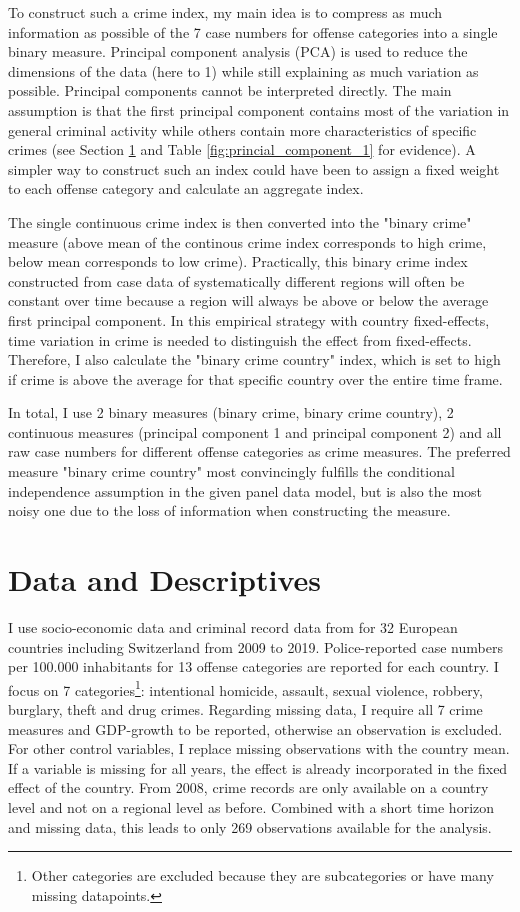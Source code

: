 \documentclass[a4paper,12pt]{article}
\begin{document}
To construct such a crime index, my main idea is to compress as much information as possible of the 7 case numbers for offense categories into a single binary measure. 
Principal component analysis (PCA) is used to reduce the dimensions of the data (here to 1) while still explaining as much variation as possible. Principal components cannot be interpreted directly. The main assumption is that the first principal component contains most of the variation in general criminal activity while others contain more characteristics of specific crimes (see Section \ref{Data} and Table \ref{fig:princial_component_1} for evidence).
A simpler way to construct such an index could have been to assign a fixed weight to each offense category and calculate an aggregate index. 

The single continuous crime index is then converted into the "binary crime" measure (above mean of the continous crime index corresponds to high crime, below mean corresponds to low crime). Practically, this binary crime index constructed from case data of systematically different regions will often be constant over time because a region will always be above or below the average first principal component. In this empirical strategy with country fixed-effects, time variation in crime is needed to distinguish the effect from fixed-effects. Therefore, I also calculate the "binary crime country" index, which is set to high if crime is above the average for that specific country over the entire time frame. 

In total, I use 2 binary measures (binary crime, binary crime country), 2 continuous measures (principal component 1 and principal component 2) and all raw case numbers for different offense categories as crime measures. The preferred measure "binary crime country" most convincingly fulfills the conditional independence assumption in the given panel data model, but is also the most noisy one due to the loss of information when constructing the measure.  

\section{Data and Descriptives}
\label{Data}
I use socio-economic data and criminal record data from \cite{eurostat} for 32 European countries including Switzerland from 2009 to 2019. 
Police-reported case numbers per 100.000 inhabitants for 13 offense categories are reported for each country. I focus on 7 categories\footnote{Other categories are excluded because they are subcategories or have many missing datapoints.}: intentional homicide, assault, sexual violence, robbery, burglary, theft and drug crimes. 
Regarding missing data, I require all 7 crime measures and GDP-growth to be reported, otherwise an observation is excluded. For other control variables, I replace missing observations with the country mean. If a variable is missing for all years, the effect is already incorporated in the fixed effect of the country.
From 2008, crime records are only available on a country level and not on a regional level as before. Combined with a short time horizon and missing data, this leads to only 269 observations available for the analysis.
\end{document}
